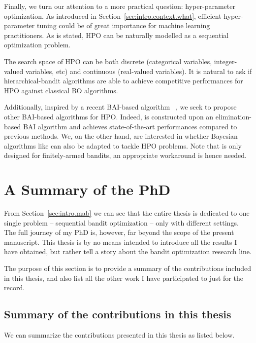 Finally, we turn our attention to a more practical question: hyper-parameter optimization. As introduced in Section~\ref{sec:intro.context.what}, efficient hyper-parameter tuning could be of great importance for machine learning practitioners. As is stated, HPO can be naturally modelled as a sequential optimization problem.

The search space of HPO can be both discrete (categorical variables, integer-valued variables, etc) and continuous (real-valued variables). It is natural to ask if hierarchical-bandit algorithms are able to achieve competitive performances for HPO against classical BO algorithms.

Additionally, inspired by a recent BAI-based algorithm \Hyperband~\citep{li2017hyperband}, we seek to propose other BAI-based algorithms for HPO. Indeed, \Hyperband is constructed upon an elimination-based BAI algorithm and achieves state-of-the-art performances compared to previous methods. We, on the other hand, are interested in whether Bayesian algorithms like \TTTS can also be adapted to tackle HPO problems. Note that \TTTS is only designed for \gls{finitely-armed bandits}, an appropriate workaround is hence needed.

\section{A Summary of the PhD}\label{sec:intro.contributions}

From Section~\ref{sec:intro.mab} we can see that the entire thesis is dedicated to one single problem -- sequential bandit optimization -- only with different settings. The full journey of my PhD is, however, far beyond the scope of the present manuscript. This thesis is by no means intended to introduce all the results I have obtained, but rather tell a story about the bandit optimization research line. 

The purpose of this section is to provide a summary of the contributions included in this thesis, and also list all the other work I have participated to just for the record.

\subsection{Summary of the contributions in this thesis}\label{sec:intro.contributions.summary}

We can summarize the contributions presented in this thesis as listed below.

